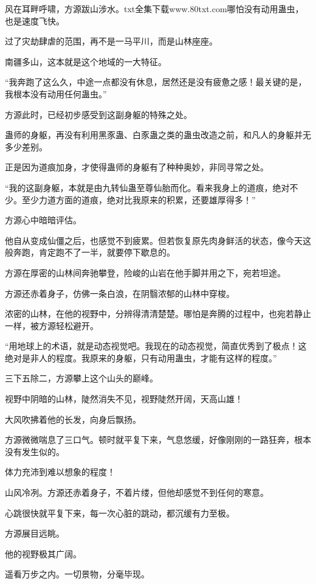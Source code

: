 
\begin{this_body}

风在耳畔呼啸，方源跋山涉水。txt全集下载www.80txt.com哪怕没有动用蛊虫，也是速度飞快。

过了灾劫肆虐的范围，再不是一马平川，而是山林座座。

南疆多山，这本就是这个地域的一大特征。

“我奔跑了这么久，中途一点都没有休息，居然还是没有疲惫之感！最关键的是，我根本没有动用任何蛊虫。”

方源此时，已经初步感受到这副身躯的特殊之处。

蛊师的身躯，再没有利用黑豕蛊、白豕蛊之类的蛊虫改造之前，和凡人的身躯并无多少差别。

正是因为道痕加身，才使得蛊师的身躯有了种种奥妙，非同寻常之处。

“我的这副身躯，本就是由九转仙蛊至尊仙胎而化。看来我身上的道痕，绝对不少。至少力道方面的道痕，绝对比我原来的积累，还要雄厚得多！”

方源心中暗暗评估。

他自从变成仙僵之后，也感觉不到疲累。但若恢复原先肉身鲜活的状态，像今天这般奔跑，肯定跑不了一半，就要停下歇息的。

方源在厚密的山林间奔驰攀登，险峻的山岩在他手脚并用之下，宛若坦途。

方源还赤着身子，仿佛一条白浪，在阴翳浓郁的山林中穿梭。

浓密的山林，在他的视野中，分辨得清清楚楚。哪怕是奔腾的过程中，也宛若静止一样，被方源轻松避开。

“用地球上的术语，就是动态视觉吧。我现在的动态视觉，简直优秀到了极点！这绝对是非人的程度。我原来的身躯，只有动用蛊虫，才能有这样的程度。”

三下五除二，方源攀上这个山头的巅峰。

视野中阴暗的山林，陡然消失不见，视野陡然开阔，天高山雄！

大风吹拂着他的长发，向身后飘扬。

方源微微喘息了三口气。顿时就平复下来，气息悠缓，好像刚刚的一路狂奔，根本没有发生似的。

体力充沛到难以想象的程度！

山风冷冽。方源还赤着身子，不着片缕，但他却感觉不到任何的寒意。

心跳很快就平复下来，每一次心脏的跳动，都沉缓有力至极。

方源展目远眺。

他的视野极其广阔。

遥看万步之内。一切景物，分毫毕现。


\end{this_body}
